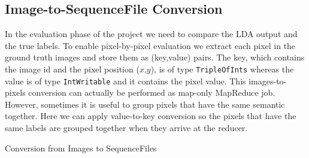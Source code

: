 \documentclass{acm_proc_article-sp}
\begin{document}
\subsection{Image-to-SequenceFile Conversion}
In the evaluation phase of the project we need to compare the LDA output and the true labels. To enable pixel-by-pixel evaluation we extract each pixel in the ground truth images and store them as (key,value) pairs. The key, which contains the image id and the pixel position ($x$,$y$), is of type \texttt{TripleOfInts} whereas the value is of type \texttt{IntWritable} and it contains the pixel value. This images-to-pixels conversion can actually be performed as map-only MapReduce job. However, sometimes it is useful to group pixels that have the same semantic together. Here we can apply value-to-key conversion so the pixels that have the same labels are grouped together when they arrive at the reducer.

\begin{algorithm}[!htb]
\SetAlgoVlined
{}

\caption{Conversion from Images to SequenceFiles}
\end{algorithm}
\end{document}
